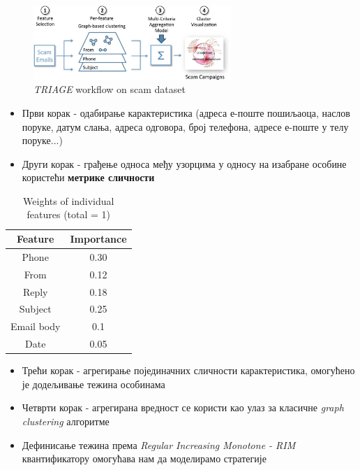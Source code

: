 \documentclass[compress, containsverbatim,mathserif, xcolor=dvipsnames, unicode]{beamer}
\begin{document}
\begin{frame}
\begin{figure}[h!]
    \centering
    \begin{center}
    \includegraphics[width=75mm]{slike/3.jpg}
    \caption{\emph{TRIAGE} workflow on scam dataset}
    \end{center}
\end{figure}

\begin{itemize}
	\item Први корак - одабирање карактеристика (адреса е-поште пошиљаоца, наслов поруке, датум слања, адреса одговора, број телефона, адресе е-поште у телу поруке...)
	\item Други корак - грађење односа међу узорцима у односу на изабране особине користећи \textbf{метрике сличности}
\end{itemize}
\end{frame}

\begin{frame}
\begin{table}[h!]
\begin{center}
\caption{Weights of individual features (total = 1)}
\begin{tabular}{|c|c|} \hline
\textbf{Feature} & \textbf{Importance} \\ \hline
Phone & 0.30\\ \hline
From & 0.12\\ \hline
Reply & 0.18\\ \hline
Subject & 0.25\\ \hline
Email body & 0.1\\ \hline
Date & 0.05\\ \hline
\end{tabular}
\label{tab:tabela3}
\end{center}
\end{table}

\begin{itemize}
	\item Трећи корак - агрегирање појединачних сличности карактеристика, омогућено је додељивање тежина особинама
	\item Четврти корак - агрегирана вредност се користи као улаз за класичне \emph{graph clustering} алгоритме
	\item Дефинисање тежина према \emph{Regular Increasing Monotone - RIM} квантификатору омогућава нам да моделирамо стратегије 
\end{itemize}
\end{frame}
	
\end{document}
